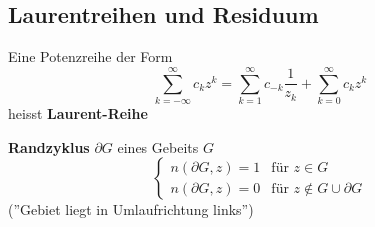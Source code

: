\subsection{Laurentreihen und Residuum}
\begin{def*}[note = Laurent-Reihe , index = Laurent Reihe , indexformat = {1!~-2 2!1-~}]
	Eine Potenzreihe der Form
	\[ \sum_{k = -\infty}^{\infty} c_k z^k = \sum_{k=1}^{\infty} c_{-k} \frac{1}{z_k} + \sum_{k=0}^{\infty} c_k z^k \]
	heisst \textbf{Laurent-Reihe}
\end{def*}
\begin{def*}[note = Randzyklus , index = Rand zyklus , indexformat = {1.2 2!~.1}]
	\textbf{Randzyklus} $\partial G$ eines Gebeits $G$
	\[ \begin{cases}
		n(\partial G,z) = 1 &\text{für } z \in G \\
		n(\partial G,z) = 0 &\text{für } z \notin G \cup \partial G
	\end{cases} \]
	(''Gebiet liegt in Umlaufrichtung links'')
\end{def*}
